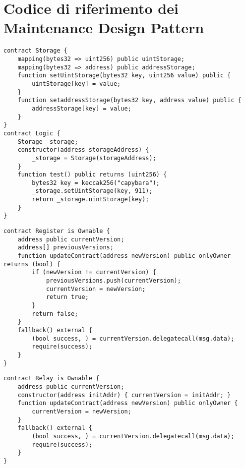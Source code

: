 {\section{Codice di riferimento dei Maintenance Design Pattern}

{\begin{lstlisting}[language=Solidity, caption={Codice di riferimento per Data Segregation}, label={appendix:data_segregation}]
contract Storage {
	mapping(bytes32 => uint256) public uintStorage;
	mapping(bytes32 => address) public addressStorage;
	function setUintStorage(bytes32 key, uint256 value) public {
		uintStorage[key] = value;
	}
	function setaddressStorage(bytes32 key, address value) public {
		addressStorage[key] = value;
	}
}
contract Logic {
	Storage _storage;
	constructor(address storageAddress) {
		_storage = Storage(storageAddress);
	}
	function test() public returns (uint256) {
		bytes32 key = keccak256("capybara");
		_storage.setUintStorage(key, 911);
		return _storage.uintStorage(key);
	}
}
\end{lstlisting}}

{\begin{lstlisting}[language=Solidity, caption={Codice di riferimento per Register}, label={appendix:register}]
contract Register is Ownable {
	address public currentVersion;
	address[] previousVersions;
	function updateContract(address newVersion) public onlyOwner returns (bool) {
		if (newVersion != currentVersion) {
			previousVersions.push(currentVersion);
			currentVersion = newVersion;
			return true;
		}
		return false;
	}
	fallback() external {
		(bool success, ) = currentVersion.delegatecall(msg.data);
		require(success);
	}
}
\end{lstlisting}}

{\begin{lstlisting}[language=Solidity, caption={Codice di riferimento per Relay}, label={appendix:relay}]
contract Relay is Ownable {
	address public currentVersion;
	constructor(address initAddr) { currentVersion = initAddr; }
	function updateContract(address newVersion) public onlyOwner {
		currentVersion = newVersion;
	}
	fallback() external {
		(bool success, ) = currentVersion.delegatecall(msg.data);
		require(success);
	}
}
\end{lstlisting}}
}
